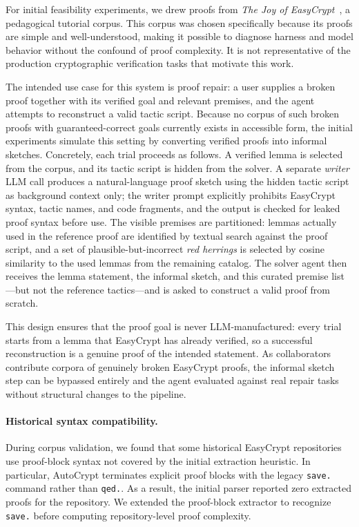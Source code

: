 \documentclass[acmsmall,natbib=false]{acmart}
\begin{document}
For initial feasibility experiments, we drew proofs from \textit{The Joy of EasyCrypt}~\cite{joyofec}, a pedagogical tutorial corpus. This corpus was chosen specifically because its proofs are simple and well-understood, making it possible to diagnose harness and model behavior without the confound of proof complexity. It is not representative of the production cryptographic verification tasks that motivate this work.

The intended use case for this system is proof repair: a user supplies a broken proof together with its verified goal and relevant premises, and the agent attempts to reconstruct a valid tactic script. Because no corpus of such broken proofs with guaranteed-correct goals currently exists in accessible form, the initial experiments simulate this setting by converting verified proofs into informal sketches. Concretely, each trial proceeds as follows. A verified lemma is selected from the corpus, and its tactic script is hidden from the solver. A separate \textit{writer} LLM call produces a natural-language proof sketch using the hidden tactic script as background context only; the writer prompt explicitly prohibits EasyCrypt syntax, tactic names, and code fragments, and the output is checked for leaked proof syntax before use. The visible premises are partitioned: lemmas actually used in the reference proof are identified by textual search against the proof script, and a set of plausible-but-incorrect \textit{red herrings} is selected by cosine similarity to the used lemmas from the remaining catalog. The solver agent then receives the lemma statement, the informal sketch, and this curated premise list---but not the reference tactics---and is asked to construct a valid proof from scratch.

This design ensures that the proof goal is never LLM-manufactured: every trial starts from a lemma that EasyCrypt has already verified, so a successful reconstruction is a genuine proof of the intended statement. As collaborators contribute corpora of genuinely broken EasyCrypt proofs, the informal sketch step can be bypassed entirely and the agent evaluated against real repair tasks without structural changes to the pipeline.

\paragraph{Historical syntax compatibility.}
During corpus validation, we found that some historical EasyCrypt repositories use proof-block syntax not covered by the initial extraction heuristic. In particular, AutoCrypt terminates explicit proof blocks with the legacy \texttt{save.} command rather than \texttt{qed.}. As a result, the initial parser reported zero extracted proofs for the repository. We extended the proof-block extractor to recognize \texttt{save.} before computing repository-level proof complexity.
\end{document}
